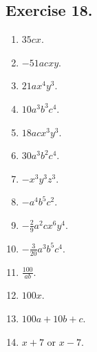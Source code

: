 \documentclass{book}
\begin{document}
\subsection*{Exercise 18.} \begin{enumerate}

\item $35 cx$.

\item $-51 acxy$.

\item $21ax^4y^3$.

\item $10a^3b^3c^4$.

\item $18acx^3y^3$.

\item $30a^3b^2c^4$.

\item $-x^3y^3z^3$.

\item $-a^4b^5c^2$.

\item $-\frac{2}{9}a^2cx^6y^4$.

\item $-\frac{3}{20}a^3b^5c^4$.

\item $\frac{100}{ab}$.

\item $100x$.

\item $100a + 10b + c$.

\item $x + 7$ or $x - 7$.
\end{enumerate}
\end{document}
